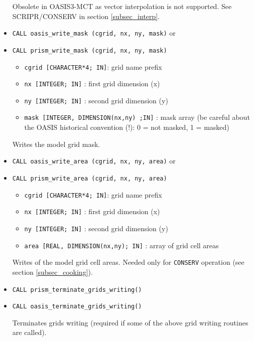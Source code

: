 \begin{itemize}
Obsolete in OASIS3-MCT as vector interpolation is not supported. 
See SCRIPR/CONSERV in section \ref{subsec_interp}.

\vspace{0.2cm}
\item {\tt CALL oasis\_write\_mask (cgrid, nx, ny, mask)} or
\item {\tt CALL prism\_write\_mask (cgrid, nx, ny, mask)}

 \begin{itemize}
    \item {\tt cgrid [CHARACTER*4; IN]}: grid name prefix 
    \item {\tt nx [INTEGER; IN]} : first grid dimension (x)
    \item {\tt ny [INTEGER; IN]} : second grid dimension (y)
    \item {\tt mask [INTEGER, DIMENSION(nx,ny) ;IN]} : mask array (be
      careful about the OASIS historical convention (!): 0 = not masked, 1 = masked)
 \end{itemize}
Writes the model grid mask.

\vspace{0.2cm}
\item {\tt CALL oasis\_write\_area (cgrid, nx, ny, area)} or
\item {\tt CALL prism\_write\_area (cgrid, nx, ny, area)}

 \begin{itemize}
    \item {\tt cgrid [CHARACTER*4; IN]}: grid name prefix
    \item {\tt nx [INTEGER; IN]} : first grid dimension (x)
    \item {\tt ny [INTEGER; IN]} : second grid dimension (y)
    \item {\tt area [REAL, DIMENSION(nx,ny); IN]} : array of grid cell areas
 \end{itemize}
Writes of the model grid cell areas. Needed only for {\tt CONSERV}
operation (see section \ref{subsec_cooking}).

\vspace{0.2cm}
\item {\tt CALL prism\_terminate\_grids\_writing()}
\item {\tt CALL oasis\_terminate\_grids\_writing()}

Terminates grids writing (required if some of the above grid writing
routines are called).

\end{itemize}

